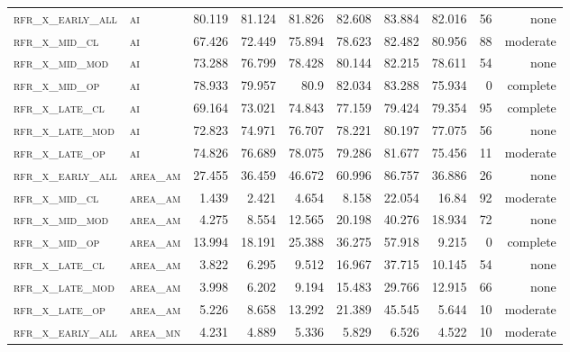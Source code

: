 \begin{landscape}
\begin{center}
\begin{footnotesize}
\begin{longtable}{llrrrrr|rrr}
\textsc{rfr\_x\_early\_all} & \textsc{ai        }   & 80.119  & 81.124  & 81.826   & 82.608   & 83.884   & 82.016  & 56  & none     \\
\textsc{rfr\_x\_mid\_cl   } & \textsc{ai        }   & 67.426  & 72.449  & 75.894   & 78.623   & 82.482   & 80.956  & 88  & moderate \\
\textsc{rfr\_x\_mid\_mod  } & \textsc{ai        }   & 73.288  & 76.799  & 78.428   & 80.144   & 82.215   & 78.611  & 54  & none     \\
\textsc{rfr\_x\_mid\_op   } & \textsc{ai        }   & 78.933  & 79.957  & 80.9     & 82.034   & 83.288   & 75.934  & 0   & complete \\
\textsc{rfr\_x\_late\_cl  } & \textsc{ai        }   & 69.164  & 73.021  & 74.843   & 77.159   & 79.424   & 79.354  & 95  & complete \\
\textsc{rfr\_x\_late\_mod } & \textsc{ai        }   & 72.823  & 74.971  & 76.707   & 78.221   & 80.197   & 77.075  & 56  & none     \\
\textsc{rfr\_x\_late\_op  } & \textsc{ai        }   & 74.826  & 76.689  & 78.075   & 79.286   & 81.677   & 75.456  & 11  & moderate \\
\textsc{rfr\_x\_early\_all} & \textsc{area\_am  }   & 27.455  & 36.459  & 46.672   & 60.996   & 86.757   & 36.886  & 26  & none     \\
\textsc{rfr\_x\_mid\_cl   } & \textsc{area\_am  }   & 1.439   & 2.421   & 4.654    & 8.158    & 22.054   & 16.84   & 92  & moderate \\
\textsc{rfr\_x\_mid\_mod  } & \textsc{area\_am  }   & 4.275   & 8.554   & 12.565   & 20.198   & 40.276   & 18.934  & 72  & none     \\
\textsc{rfr\_x\_mid\_op   } & \textsc{area\_am  }   & 13.994  & 18.191  & 25.388   & 36.275   & 57.918   & 9.215   & 0   & complete \\
\textsc{rfr\_x\_late\_cl  } & \textsc{area\_am  }   & 3.822   & 6.295   & 9.512    & 16.967   & 37.715   & 10.145  & 54  & none     \\
\textsc{rfr\_x\_late\_mod } & \textsc{area\_am  }   & 3.998   & 6.202   & 9.194    & 15.483   & 29.766   & 12.915  & 66  & none     \\
\textsc{rfr\_x\_late\_op  } & \textsc{area\_am  }   & 5.226   & 8.658   & 13.292   & 21.389   & 45.545   & 5.644   & 10  & moderate \\
\textsc{rfr\_x\_early\_all} & \textsc{area\_mn  }   & 4.231   & 4.889   & 5.336    & 5.829    & 6.526    & 4.522   & 10  & moderate \\

\end{longtable}
\end{footnotesize}
\end{center}
\end{landscape}
